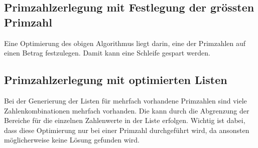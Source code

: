 \documentclass[10pt, fleqn]{article}
\begin{document}
\subsection{Primzahlzerlegung mit Festlegung der grössten Primzahl}
Eine Optimierung des obigen Algorithmus liegt darin, eine der Primzahlen auf 
einen Betrag festzulegen. Damit kann eine Schleife gespart werden. 
% 

\subsection{Primzahlzerlegung mit optimierten Listen}
Bei der Generierung der Listen für mehrfach vorhandene Primzahlen sind viele 
Zahlenkombinationen mehrfach vorhanden. Die kann durch die Abgrenzung der 
Bereiche für die einzelnen Zahlenwerte in der Liste erfolgen. Wichtig ist 
dabei, dass diese Optimierung nur bei einer Primzahl durchgeführt wird, da 
ansonsten möglicherweise keine Lösung gefunden wird. 
% 
\end{document}
